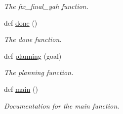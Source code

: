 \begin{DoxyCompactItemize}
\begin{DoxyCompactList}\small\item\em The fix\+\_\+final\+\_\+yah function. \end{DoxyCompactList}\item 
def \hyperlink{namespacego__to__point__action_a9fec1cd57aebd720828b5bab962048db}{done} ()
\begin{DoxyCompactList}\small\item\em The done function. \end{DoxyCompactList}\item 
def \hyperlink{namespacego__to__point__action_ab3bc8cf3239eaa0def69f3a87a98976c}{planning} (goal)
\begin{DoxyCompactList}\small\item\em The planning function. \end{DoxyCompactList}\item 
def \hyperlink{namespacego__to__point__action_a33cfc08b34e07f53ddda67d2ab551ba1}{main} ()
\begin{DoxyCompactList}\small\item\em Documentation for the main function. \end{DoxyCompactList}\end{DoxyCompactItemize}
